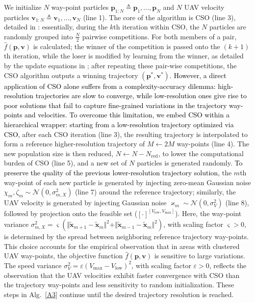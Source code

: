 \documentclass[12pt, draftcls, onecolumn]{IEEEtran}
\theoremstyle{plain}
\theoremstyle{definition}
\theoremstyle{remark}
\newcommand\hlt[1]{\textcolor{black}{#1}}
\begin{document}
We initialize $N$ way-point particles $\mathbf{p}_{1:N}{\triangleq}\mathbf{p}_{1},{\dots},\mathbf{p}_{N}$ and $N$ UAV velocity particles $\mathbf{v}_{1:N}\triangleq\mathbf{v}_{1},\dots,\mathbf{v}_{N}$ (line 1). The core of the algorithm is CSO (line 3), detailed in \cite{CSO}: essentially, during the $k$th iteration within CSO, the  $N$ particles are randomly grouped into $\frac{N}{2}$ pairwise competitions. For both members of a pair, $\hat{f}(\mathbf{p},\mathbf{v})$ is calculated; the winner of the competition is passed onto the $(k{+}1)$th iteration, while the loser is modified by learning from the winner, as detailed by the update equations in \cite{CSO};
after repeating these pair-wise competitions, the CSO algorithm outputs a winning trajectory $(\mathbf{p}^*,\mathbf{v}^*)$. \label{dilemma}\hlt{However, a direct application of CSO alone suffers from a complexity-accuracy dilemma: high-resolution trajectories are slow to converge, while low-resolution ones give rise to poor solutions that fail to capture fine-grained variations in the trajectory way-points and velocities. To overcome this limitation, we embed CSO  within a hierarchical wrapper: starting from a low-resolution trajectory optimized via CSO,}
after each CSO iteration (line 3), the resulting trajectory is interpolated to form a reference higher-resolution trajectory of $M{\gets}2M$ way-points (line 4). The new population size is then reduced, $N{\gets}N{-}N_{\mathrm{red}}$, to lower the computational burden of CSO (line 5), and a new set of $N$ particles is generated randomly. \hlt{To preserve the quality of the previous lower-resolution trajectory solution,} the $m$th way-point of each new particle is generated by injecting zero-mean Gaussian noise $\chi_{m},\zeta_{m}{\sim}\mathcal{N}\left(0,\sigma_{m,X}^2\right)$ (line 7) around the reference trajectory; similarly, the UAV velocity is
generated by injecting Gaussian noise $\varkappa_{m}{\sim}\mathcal{N}(0,\sigma_V^2)$ (line 8), followed by projection onto the feasible set ($[\cdot]^{[V_{\mathrm{low}},V_{\mathrm{max}}]}$). Here, the way-point variance  $\sigma_{m,X}^2=\varsigma(\Vert\tilde{\mathbf{x}}_{m{+}1}{-}\tilde{\mathbf{x}}_{m}\Vert^{2}{+}\Vert\tilde{\mathbf{x}}_{m{-}1}{-}\tilde{\mathbf{x}}_{m}\Vert^2)$, with scaling factor $\varsigma{>}0$, is determined by the spread between neighboring reference trajectory way-points. This choice accounts for the empirical observation that in areas with clustered UAV way-points, the objective function $\hat{f}(\mathbf{p},\mathbf{v})$ is sensitive to large variations. The speed variance $\sigma_V^2=\varepsilon(V_{\mathrm{max}}{-}V_{\mathrm{low}})^{2}$, with scaling factor $\varepsilon{>}0$, reflects the observation that the UAV velocities exhibit faster convergence with CSO than the trajectory way-points and less sensitivity to random initialization. These steps in Alg.~\ref{A3} continue until the desired trajectory resolution is reached. 
\end{document}
